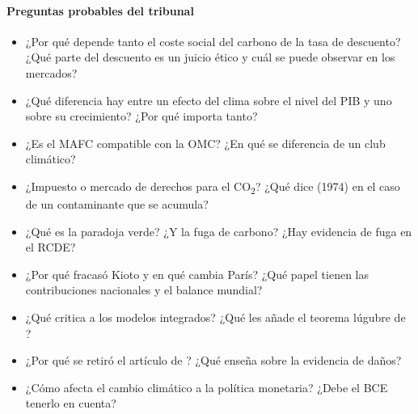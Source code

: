 \documentclass[11pt]{article}
\begin{document}
\paragraph{Preguntas probables del tribunal}

\begin{itemize}
\item ¿Por qué depende tanto el coste social del carbono de la tasa de descuento? ¿Qué parte del descuento es un juicio ético y cuál se puede observar en los mercados?
\item ¿Qué diferencia hay entre un efecto del clima sobre el nivel del PIB y uno sobre su crecimiento? ¿Por qué importa tanto?
\item ¿Es el MAFC compatible con la OMC? ¿En qué se diferencia de un club climático?
\item ¿Impuesto o mercado de derechos para el CO\textsubscript{2}? ¿Qué dice  (1974) en el caso de un contaminante que se acumula?
\item ¿Qué es la paradoja verde? ¿Y la fuga de carbono? ¿Hay evidencia de fuga en el RCDE?
\item ¿Por qué fracasó Kioto y en qué cambia París? ¿Qué papel tienen las contribuciones nacionales y el balance mundial?
\item ¿Qué critica  a los modelos integrados? ¿Qué les añade el teorema lúgubre de ?
\item ¿Por qué se retiró el artículo de \textcite{Kotz2024Economic}? ¿Qué enseña sobre la evidencia de daños?
\item ¿Cómo afecta el cambio climático a la política monetaria? ¿Debe el BCE tenerlo en cuenta?
\end{itemize}

\bibliografia
\end{document}

